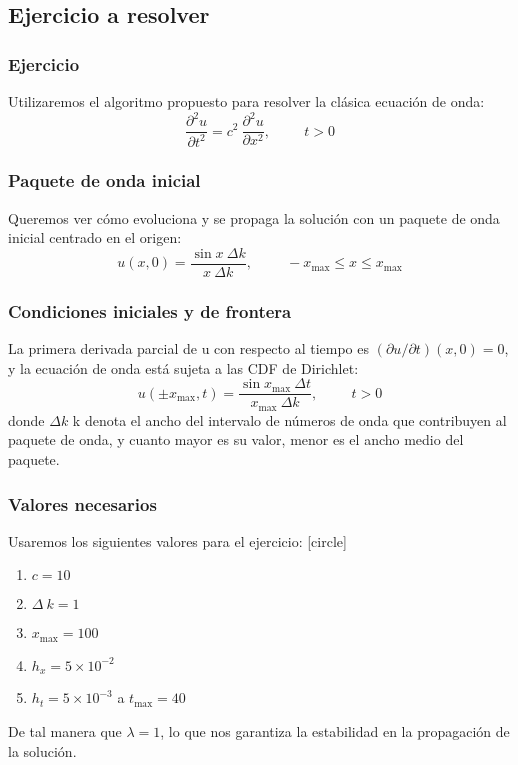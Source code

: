 \subsection{Ejercicio a resolver}
\begin{frame}
\frametitle{Ejercicio}
Utilizaremos el algoritmo propuesto para resolver la clásica ecuación de onda:
\begin{equation}
\dfrac{\partial^{2} u }{\partial t^{2}} = c^{2} \: \dfrac{\partial^{2} u}{\partial x^{2}},  \hspace{1cm} t > 0
\label{eq:ecuacion_13_140}
\end{equation}
\end{frame}
\begin{frame}
\frametitle{Paquete de onda inicial}
Queremos ver cómo evoluciona y se propaga la solución con un paquete de onda inicial centrado en el origen:
\begin{equation}
u(x, 0) = \dfrac{\sin x \: \Delta k}{x \: \Delta k}, \hspace{1cm} -x_{\text{max}} \leq x \leq x_{\text{max}}
\label{eq:ecuacion_13_141}
\end{equation}
\end{frame}
\begin{frame}
\frametitle{Condiciones iniciales y de frontera}
La primera derivada parcial de u con respecto al tiempo es $(\partial u/\partial t)(x, 0) = 0$, y la ecuación de onda está sujeta a las CDF de Dirichlet:
\begin{equation}
u(\pm x_{\text{max}}, t) = \dfrac{\sin x_{\text{max}} \: \Delta t}{x_{\text{max}} \: \Delta k}, \hspace{1cm} t > 0
\label{eq:ecuacion_13_142}
\end{equation}
donde $\Delta k$ k denota el ancho del intervalo de números de onda que contribuyen al paquete de onda, y cuanto mayor es su valor, menor es el ancho medio del paquete.
\end{frame}
\begin{frame}
\frametitle{Valores necesarios}
Usaremos los siguientes valores para el ejercicio:
[circle]
\begin{enumerate}[<+->]
\item $c = 10$
\item $ \Delta \: k = 1$
\item $x_{\text{max}} = 100$
\item $h_{x} = 5 \times 10^{-2}$
\item $h_{t} = 5 \times 10^{-3}$ a $t_{\text{max}} = 40$
\end{enumerate}
\pause
De tal manera que $\lambda=1$, lo que nos garantiza la estabilidad en la propagación de la solución.
\end{frame}
